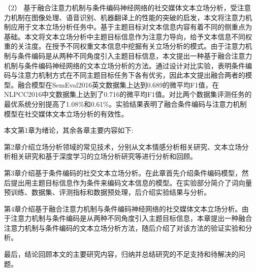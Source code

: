 （2） 基于融合注意力机制与条件编码神经网络的社交媒体文本立场分析，受注意力机制在图像处理、语音识别、机器翻译上的性能的突破的启发，本文将注意力机制应用于文本立场分析任务中。基于主题目标对文本信息内容有着不同的侧重点为基础。本文将文本立场分析中主题目标信息作为注意力导向，给予文本信息不同权重的关注度。在授予不同权重文本信息中挖掘有关立场分析的模式。由于注意力机制与条件编码是从两种不同角度引入主题目标信息，本文提出一种基于融合注意力机制与条件编码神经网络的文本立场分析的方法。通过设计对比实验，表明条件编码与注意力机制方式在不同主题目标任务下各有优劣，因此本文提出融合两者的模型。融合模型在SemEval2016英文数据集上达到0.689的微平均F1值，在NLPCC2016中文数据集上达到了0.716的微平均F1值。对比两个数据集评测任务的最优系统分别提高了1.08\%和0.61\%。实验结果表明了融合条件编码与注意力机制模型在社交媒体文本立场分析的有效性。

本文第1章为绪论，其余各章主要内容如下:

第2章介绍立场分析领域的常见技术，分别从文本情感分析相关研究、文本立场分析相关研究和基于深度学习的立场分析研究等进行分析和回顾。

第3章介绍基于条件编码的社交文本立场分析。在此章首先介绍条件编码模型，然后提出用主题目标信息作为条件来编码文本信息的模型。在实验部分简介了词向量预训练、数据集、评测指标和数据预处理，后介绍实验结果与分析。

第4章介绍基于融合注意力机制与条件编码神经网络的社交媒体文本立场分析。由于注意力机制与条件编码是从两种不同角度引入主题目标信息，本章提出一种融合注意力机制与条件编码的文本立场分析方法，随后介绍了对该方法的验证实验和分析。

最后，结论回顾本文的主要研究内容，归纳并总结研究的不足支持和待解决的问题。

